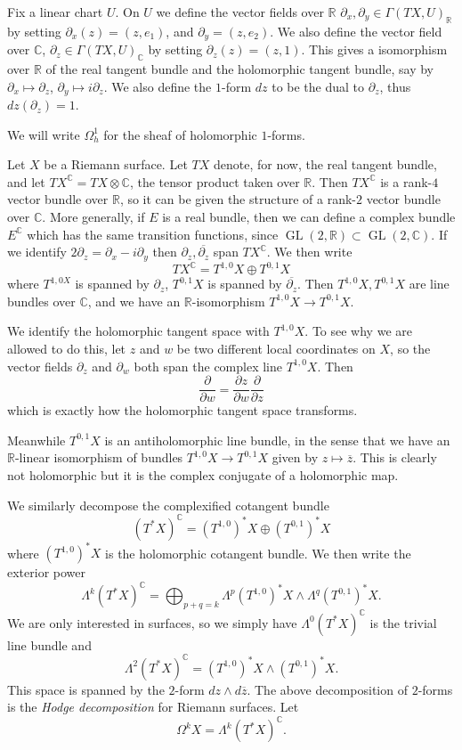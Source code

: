 \documentclass[12pt]{book}
\newcommand{\RR}{\mathbb{R}}
\newcommand{\CC}{\mathbb{C}}
\DeclareMathOperator{\GL}{GL}
\newcommand{\dfn}[1]{\emph{#1}\index{#1}}
\theoremstyle{definition}
\begin{document}
Fix a linear chart $U$.
On $U$ we define the vector fields over $\RR$ $\partial_x,\partial_y \in \Gamma(TX, U)_\RR$ by setting $\partial_x(z) = (z, e_1)$, and $\partial_y = (z, e_2)$.
We also define the vector field over $\CC$, $\partial_z \in \Gamma(TX, U)_\CC$ by setting $\partial_z(z) = (z, 1)$.
This gives a isomorphism over $\RR$ of the real tangent bundle and the holomorphic tangent bundle, say by $\partial_x \mapsto \partial_z$, $\partial_y \mapsto i\partial_z$.
We also define the $1$-form $dz$ to be the dual to $\partial_z$, thus $dz(\partial_z) = 1$.

We will write $\Omega_h^1$ for the sheaf of holomorphic $1$-forms.

Let $X$ be a Riemann surface.
Let $TX$ denote, for now, the real tangent bundle, and let $TX^\CC = TX \otimes \CC$, the tensor product taken over $\RR$.
Then $TX^\CC$ is a rank-$4$ vector bundle over $\RR$, so it can be given the structure of a rank-$2$ vector bundle over $\CC$.
More generally, if $E$ is a real bundle, then we can define a complex bundle $E^\CC$ which has the same transition functions, since $\GL(2, \RR) \subset \GL(2, \CC)$.
If we identify $2\partial_z = \partial_x - i\partial_y$ then $\partial_z,\overline{\partial_z}$ span $TX^\CC$.
We then write
$$TX^\CC = T^{1,0}X \oplus T^{0,1}X$$
where $T^{1,0X}$ is spanned by $\partial_z$, $T^{0,1}X$ is spanned by $\overline{\partial_z}$.
Then $T^{1,0}X,T^{0,1}X$ are line bundles over $\CC$, and we have an $\RR$-isomorphism $T^{1,0}X \to T^{0,1}X$.

We identify the holomorphic tangent space with $T^{1,0}X$.
To see why we are allowed to do this, let $z$ and $w$ be two different local coordinates on $X$, so the vector fields $\partial_z$ and $\partial_w$ both span the complex line $T^{1,0}X$.
Then
$$\frac{\partial}{\partial w} = \frac{\partial z}{\partial w} \frac{\partial}{\partial z}$$
which is exactly how the holomorphic tangent space transforms.

Meanwhile $T^{0,1}X$ is an antiholomorphic line bundle, in the sense that we have an $\RR$-linear isomorphism of bundles $T^{1,0}X \to T^{0,1}X$ given by $z \mapsto \overline z$.
This is clearly not holomorphic but it is the complex conjugate of a holomorphic map.

We similarly decompose the complexified cotangent bundle
$$(T^*X)^\CC = (T^{1,0})^*X \oplus (T^{0,1})^*X$$
where $(T^{1,0})^*X$ is the holomorphic cotangent bundle.
We then write the exterior power
$$\Lambda^k (T^*X)^\CC = \bigoplus_{p + q = k} \Lambda^p (T^{1,0})^*X \wedge \Lambda^q (T^{0,1})^*X.$$
We are only interested in surfaces, so we simply have $\Lambda^0 (T^*X)^\CC$ is the trivial line bundle and
$$\Lambda^2 (T^*X)^\CC = (T^{1,0})^*X \wedge (T^{0,1})^*X.$$
This space is spanned by the $2$-form $dz \wedge d\overline z$.
The above decomposition of $2$-forms is the \dfn{Hodge decomposition} for Riemann surfaces.
Let
$$\Omega^k X = \Lambda^k (T^*X)^\CC.$$
\end{document}
